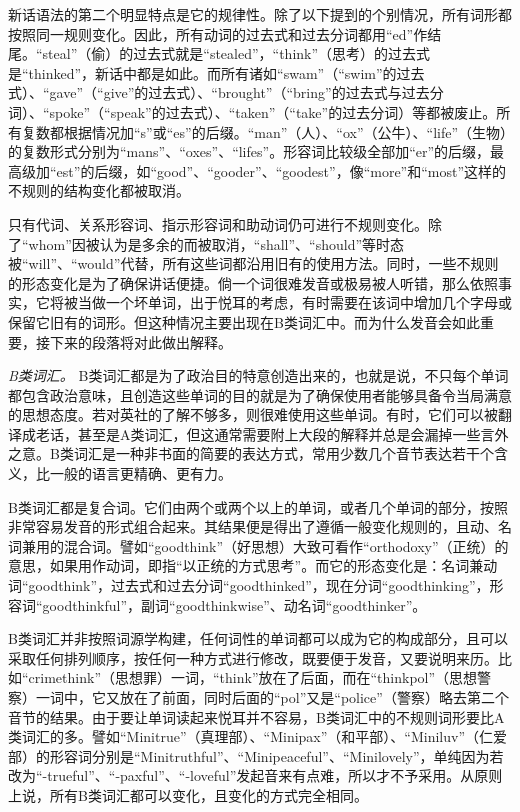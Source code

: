 新话语法的第二个明显特点是它的规律性。除了以下提到的个别情况，所有词形都按照同一规则变化。因此，所有动词的过去式和过去分词都用``ed''作结尾。``steal''（偷）的过去式就是``stealed''，``think''（思考）的过去式是``thinked''，新话中都是如此。而所有诸如``swam''（``swim''的过去式）、``gave''（``give''的过去式）、``brought''（``bring''的过去式与过去分词）、``spoke''（``speak''的过去式）、``taken''（``take''的过去分词）等都被废止。所有复数都根据情况加``s''或``es''的后缀。``man''（人）、``ox''（公牛）、``life''（生物）的复数形式分别为``mans''、``oxes''、``lifes''。形容词比较级全部加``er''的后缀，最高级加``est''的后缀，如``good''、``gooder''、``goodest''，像``more''和``most''这样的不规则的结构变化都被取消。

只有代词、关系形容词、指示形容词和助动词仍可进行不规则变化。除了``whom''因被认为是多余的而被取消，``shall''、``should''等时态被``will''、``would''代替，所有这些词都沿用旧有的使用方法。同时，一些不规则的形态变化是为了确保讲话便捷。倘一个词很难发音或极易被人听错，那么依照事实，它将被当做一个坏单词，出于悦耳的考虑，有时需要在该词中增加几个字母或保留它旧有的词形。但这种情况主要出现在B类词汇中。而为什么发音会如此重要，接下来的段落将对此做出解释。

\sectionbreak

\emph{B类词汇。} B类词汇都是为了政治目的特意创造出来的，也就是说，不只每个单词都包含政治意味，且创造这些单词的目的就是为了确保使用者能够具备令当局满意的思想态度。若对英社的了解不够多，则很难使用这些单词。有时，它们可以被翻译成老话，甚至是A类词汇，但这通常需要附上大段的解释并总是会漏掉一些言外之意。B类词汇是一种非书面的简要的表达方式，常用少数几个音节表达若干个含义，比一般的语言更精确、更有力。

B类词汇都是复合词。它们由两个或两个以上的单词，或者几个单词的部分，按照非常容易发音的形式组合起来。其结果便是得出了遵循一般变化规则的，且动、名词兼用的混合词。譬如``goodthink''（好思想）大致可看作``orthodoxy''（正统）的意思，如果用作动词，即指``以正统的方式思考''。而它的形态变化是：名词兼动词``goodthink''，过去式和过去分词``goodthinked''，现在分词``goodthinking''，形容词``goodthinkful''，副词``goodthinkwise''、动名词``goodthinker''。

B类词汇并非按照词源学构建，任何词性的单词都可以成为它的构成部分，且可以采取任何排列顺序，按任何一种方式进行修改，既要便于发音，又要说明来历。比如``crimethink''（思想罪）一词，``think''放在了后面，而在``thinkpol''（思想警察）一词中，它又放在了前面，同时后面的``pol''又是``police''（警察）略去第二个音节的结果。由于要让单词读起来悦耳并不容易，B类词汇中的不规则词形要比A类词汇的多。譬如``Minitrue''（真理部）、``Minipax''（和平部）、``Miniluv''（仁爱部）的形容词分别是``Minitruthful''、``Minipeaceful''、``Minilovely''，单纯因为若改为``-trueful''、``-paxful''、``-loveful''发起音来有点难，所以才不予采用。从原则上说，所有B类词汇都可以变化，且变化的方式完全相同。

